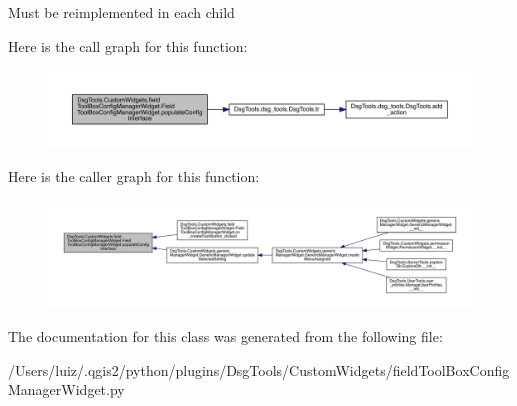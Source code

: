 \begin{DoxyVerb}Must be reimplemented in each child
\end{DoxyVerb}
 Here is the call graph for this function\+:
\nopagebreak
\begin{figure}[H]
\begin{center}
\leavevmode
\includegraphics[width=350pt]{class_dsg_tools_1_1_custom_widgets_1_1field_tool_box_config_manager_widget_1_1_field_tool_box_config_manager_widget_af50bd74e85c21db31c631915b3085926_cgraph}
\end{center}
\end{figure}
Here is the caller graph for this function\+:
\nopagebreak
\begin{figure}[H]
\begin{center}
\leavevmode
\includegraphics[width=350pt]{class_dsg_tools_1_1_custom_widgets_1_1field_tool_box_config_manager_widget_1_1_field_tool_box_config_manager_widget_af50bd74e85c21db31c631915b3085926_icgraph}
\end{center}
\end{figure}


The documentation for this class was generated from the following file\+:\begin{DoxyCompactItemize}
\item 
/\+Users/luiz/.\+qgis2/python/plugins/\+Dsg\+Tools/\+Custom\+Widgets/field\+Tool\+Box\+Config\+Manager\+Widget.\+py\end{DoxyCompactItemize}
